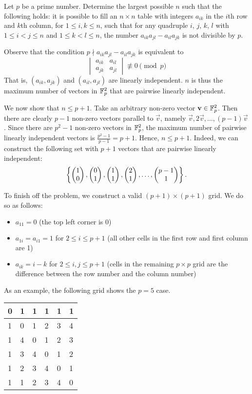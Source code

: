 \begin{question}[$p+1$]\label{Q::2024-O-2-5}
    Let $p$ be a prime number. Determine the largest possible $n$ such that the following holds: it is possible to fill an $n \times n$ table with integers $a_{ik}$ in the $i$th row and $k$th column, for $1 \leq i, k \leq n$, such that for any quadruple $i$, $j$, $k$, $l$ with $1 \leq i < j \leq n$ and $1 \leq k < l \leq n$, the number $a_{ik}a_{jl} - a_{il}a_{jk}$ is not divisible by $p$.
\end{question}
\begin{solution*}
    Observe that the condition $p \nmid a_{ik}a_{jl} - a_{il}a_{jk}$ is equivalent to \[
    \begin{vmatrix}
        a_{ik} & a_{il}\\
        a_{jk} & a_{jl}
    \end{vmatrix} \not\equiv 0 \pmod{p}\] That is, $(a_{ik}, a_{jk})$ and $(a_{il}, a_{jl})$ are linearly independent. $n$ is thus the maximum number of vectors in $\mathbb{F}_p^2$ that are pairwise linearly independent. 

    We now show that $n \leq p + 1$. Take an arbitrary non-zero vector $\mathbf{v} \in \mathbb{F}_p^2$. Then there are clearly $p-1$ non-zero vectors parallel to $\vec v$, namely $\vec v, 2\vec v, \ldots, (p-1)\vec v$. Since there are $p^2 - 1$ non-zero vectors in $\mathbb{F}_p^2$, the maximum number of pairwise linearly independent vectors is $\frac{p^2 - 1}{p - 1} = p + 1$. Hence, $n \leq p+1$. Indeed, we can construct the following set with $p+1$ vectors that are pairwise linearly independent: \[\left\lbrace \begin{pmatrix} 1 \\ 0 \end{pmatrix}, \begin{pmatrix} 0 \\ 1 \end{pmatrix}, \begin{pmatrix} 1 \\ 1 \end{pmatrix}, \begin{pmatrix} 2 \\ 1 \end{pmatrix}, \ldots, \begin{pmatrix} p-1 \\ 1 \end{pmatrix} \right\rbrace.\]

    To finish off the problem, we construct a valid $(p + 1) \times (p + 1)$ grid. We do so as follows:
    \begin{itemize}
        \item $a_{11} = 0$ (the top left corner is 0)
        \item $a_{1i} = a_{i1} = 1$ for $2 \leq i \leq p+1$ (all other cells in the first row and first column are 1)
        \item $a_{ik} = i-k$ for $2 \leq i, j \leq p + 1$ (cells in the remaining $p \times p$ grid are the difference between the row number and the column number)
    \end{itemize}
    As an example, the following grid shows the $p = 5$ case.
    \begin{table}[h]
        \centering
        \begin{tabular}{|l|l|l|l|l|l|}
        \hline
        0 & 1 & 1 & 1 & 1 & 1 \\ \hline
        1 & 0 & 1 & 2 & 3 & 4 \\ \hline
        1 & 4 & 0 & 1 & 2 & 3 \\ \hline
        1 & 3 & 4 & 0 & 1 & 2 \\ \hline
        1 & 2 & 3 & 4 & 0 & 1 \\ \hline
        1 & 1 & 2 & 3 & 4 & 0 \\ \hline
        \end{tabular}
    \end{table}


\end{solution*}
